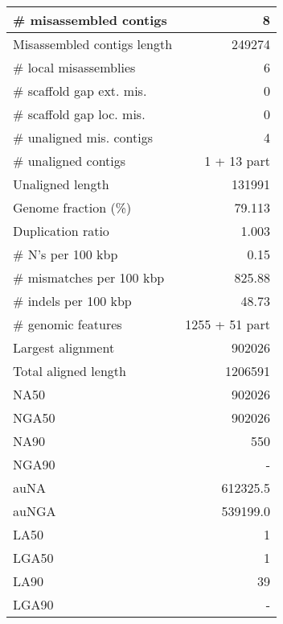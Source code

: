 \documentclass[12pt,a4paper]{article}
\begin{document}
\begin{table}[ht]
\begin{center}
\begin{tabular}{|l*{1}{|r}|}
\# misassembled contigs & 8 \\ \hline
Misassembled contigs length & 249274 \\ \hline
\# local misassemblies & 6 \\ \hline
\# scaffold gap ext. mis. & 0 \\ \hline
\# scaffold gap loc. mis. & 0 \\ \hline
\# unaligned mis. contigs & 4 \\ \hline
\# unaligned contigs & 1 + 13 part \\ \hline
Unaligned length & 131991 \\ \hline
Genome fraction (\%) & 79.113 \\ \hline
Duplication ratio & 1.003 \\ \hline
\# N's per 100 kbp & 0.15 \\ \hline
\# mismatches per 100 kbp & 825.88 \\ \hline
\# indels per 100 kbp & 48.73 \\ \hline
\# genomic features & 1255 + 51 part \\ \hline
Largest alignment & 902026 \\ \hline
Total aligned length & 1206591 \\ \hline
NA50 & 902026 \\ \hline
NGA50 & 902026 \\ \hline
NA90 & 550 \\ \hline
NGA90 & - \\ \hline
auNA & 612325.5 \\ \hline
auNGA & 539199.0 \\ \hline
LA50 & 1 \\ \hline
LGA50 & 1 \\ \hline
LA90 & 39 \\ \hline
LGA90 & - \\ \hline
\end{tabular}
\end{center}
\end{table}
\end{document}
